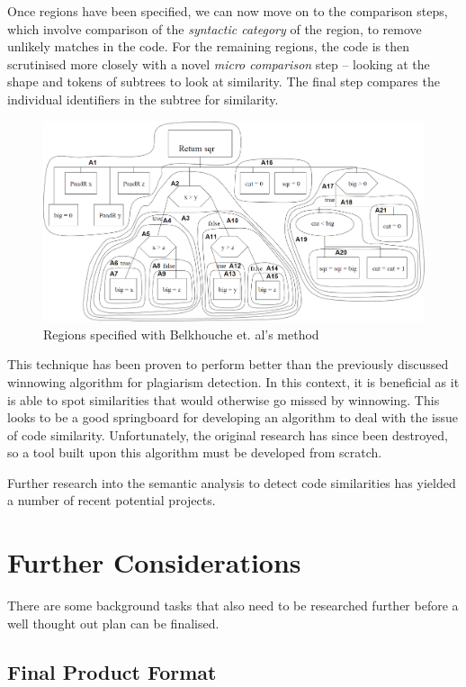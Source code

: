 Once regions have been specified, we can now move on to the comparison steps,
which involve comparison of the \emph{syntactic category} of the region, to 
remove unlikely matches in the code. For the remaining regions, the code
is then scrutinised more closely with a novel \emph{micro comparison} step -- 
looking at the shape and tokens of subtrees to look at similarity. The final step
compares the individual identifiers in the subtree for similarity.

\begin{figure}[h]
	\centering
		\includegraphics[width=\textwidth]{Figures/Belkhouche}
	\caption{Regions specified with Belkhouche et. al's method~\cite{Belkhouche}}
	\label{fig:BelkhoucheComparison}
\end{figure}

This technique has been proven to perform better than the previously discussed
winnowing algorithm for plagiarism detection. In this context, it is beneficial
as it is able to spot similarities that would otherwise go missed by winnowing.
This looks to be a good springboard for developing an algorithm to deal with
the issue of code similarity. Unfortunately,
the original research has since been destroyed, so a tool built upon this algorithm 
must be developed from scratch.

Further research into the semantic analysis to detect code similarities has yielded
a number of recent potential projects.

\section{Further Considerations}

There are some background tasks that also need to be researched further before a
well thought out plan can be finalised.

\subsection{Final Product Format}

